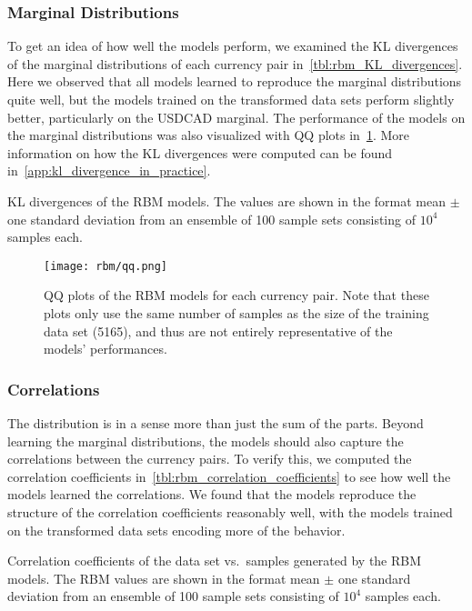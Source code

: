 \subsubsection{Marginal Distributions}
To get an idea of how well the models perform, we examined the KL divergences of the marginal distributions of each currency pair in~\cref{tbl:rbm_KL_divergences}.
Here we observed that all models learned to reproduce the marginal distributions quite well, but the models trained on the transformed data sets perform slightly better, particularly on the USDCAD marginal.
The performance of the models on the marginal distributions was also visualized with QQ plots in~\cref{fig:rbm_qq_plots}.
More information on how the KL divergences were computed can be found in~\cref{app:kl_divergence_in_practice}.
\begin{table}[!htb]
    \centering
    \begin{adjustbox}{max width=\textwidth}
        
    \end{adjustbox}
    \caption{
        KL divergences of the RBM models.
        The values are shown in the format mean \(\pm\) one standard deviation from an ensemble of 100 sample sets consisting of \( 10^4 \) samples each.
    }
    \label{tbl:rbm_KL_divergences}
\end{table}
\begin{figure}[!htb]
    \begin{center}
        \texttt{[image: rbm/qq.png]}
    \end{center}
    \caption{QQ plots of the RBM models for each currency pair. Note that these plots only use the same number of samples as the size of the training data set (5165), and thus are not entirely representative of the models' performances.}
    \label{fig:rbm_qq_plots}
\end{figure}

\subsubsection{Correlations}
The distribution is in a sense more than just the sum of the parts.
Beyond learning the marginal distributions, the models should also capture the correlations between the currency pairs.
To verify this, we computed the correlation coefficients in~\cref{tbl:rbm_correlation_coefficients} to see how well the models learned the correlations.
We found that the models reproduce the structure of the correlation coefficients reasonably well, with the models trained on the transformed data sets encoding more of the behavior.
\begin{table}[!htb]
    \centering
    \begin{adjustbox}{max width=\textwidth}
        
    \end{adjustbox}
    \caption{Correlation coefficients of the data set vs.~samples generated by the RBM models. The RBM values are shown in the format mean \(\pm\) one standard deviation from an ensemble of 100 sample sets consisting of \( 10^4 \) samples each.}
    \label{tbl:rbm_correlation_coefficients}
\end{table}


